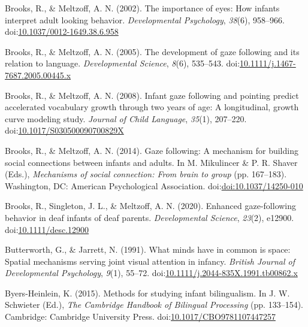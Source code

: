 \documentclass[,man,floatsintext]{apa6}
\begin{document}
\leavevmode\hypertarget{ref-Brooks_Meltzoff_2002}{}%
Brooks, R., \& Meltzoff, A. N. (2002). The importance of eyes: How infants interpret adult looking behavior. \emph{Developmental Psychology}, \emph{38}(6), 958--966. doi:\href{https://doi.org/10.1037/0012-1649.38.6.958}{10.1037/0012-1649.38.6.958}

\leavevmode\hypertarget{ref-Brooks_Meltzoff_2005}{}%
Brooks, R., \& Meltzoff, A. N. (2005). The development of gaze following and its relation to language. \emph{Developmental Science}, \emph{8}(6), 535--543. doi:\href{https://doi.org/10.1111/j.1467-7687.2005.00445.x}{10.1111/j.1467-7687.2005.00445.x}

\leavevmode\hypertarget{ref-Brooks_Meltzoff_2008}{}%
Brooks, R., \& Meltzoff, A. N. (2008). Infant gaze following and pointing predict accelerated vocabulary growth through two years of age: A longitudinal, growth curve modeling study. \emph{Journal of Child Language}, \emph{35}(1), 207--220. doi:\href{https://doi.org/10.1017/S030500090700829X}{10.1017/S030500090700829X}

\leavevmode\hypertarget{ref-Brooks_Meltzoff_2014}{}%
Brooks, R., \& Meltzoff, A. N. (2014). Gaze following: A mechanism for building social connections between infants and adults. In M. Mikulincer \& P. R. Shaver (Eds.), \emph{Mechanisms of social connection: From brain to group} (pp. 167--183). Washington, DC: American Psychological Association. doi:\href{https://doi.org/doi:10.1037/14250-010}{doi:10.1037/14250-010}

\leavevmode\hypertarget{ref-Brooks_etal_2020}{}%
Brooks, R., Singleton, J. L., \& Meltzoff, A. N. (2020). Enhanced gaze-following behavior in deaf infants of deaf parents. \emph{Developmental Science}, \emph{23}(2), e12900. doi:\href{https://doi.org/10.1111/desc.12900}{10.1111/desc.12900}

\leavevmode\hypertarget{ref-Butterworth_Jarrett_1991}{}%
Butterworth, G., \& Jarrett, N. (1991). What minds have in common is space: Spatial mechanisms serving joint visual attention in infancy. \emph{British Journal of Developmental Psychology}, \emph{9}(1), 55--72. doi:\href{https://doi.org/10.1111/j.2044-835X.1991.tb00862.x}{10.1111/j.2044-835X.1991.tb00862.x}

\leavevmode\hypertarget{ref-Byers-Heinlein_2015}{}%
Byers-Heinlein, K. (2015). Methods for studying infant bilingualism. In J. W. Schwieter (Ed.), \emph{The Cambridge Handbook of Bilingual Processing} (pp. 133--154). Cambridge: Cambridge University Press. doi:\href{https://doi.org/10.1017/CBO9781107447257}{10.1017/CBO9781107447257}
\end{document}
